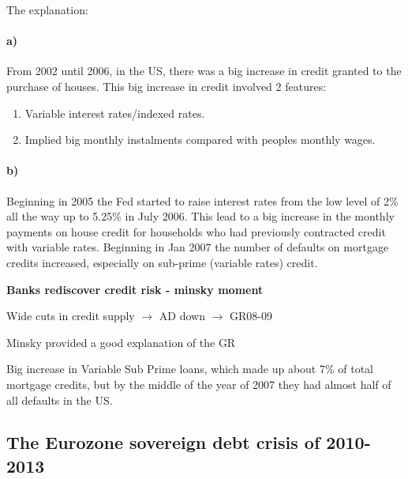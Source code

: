 \documentclass{report}
\begin{document}
The explanation:

\paragraph{a)} From 2002 until 2006, in the US, there was a big increase in credit granted to the purchase of houses. This big increase in credit involved 2 features:
\begin{enumerate}
    \item Variable interest rates/indexed rates. 
    \item Implied big monthly instalments compared with peoples monthly wages. 
\end{enumerate}
\paragraph{b)} Beginning in 2005 the Fed started to raise interest rates from the low level of 2\% all the way up to 5.25\% in July 2006. This lead to a big increase in the monthly payments on house credit for households who had previously contracted credit with variable rates. Beginning in Jan 2007 the number of defaults on mortgage credits increased, especially on sub-prime (variable rates) credit. 

\textbf{Banks rediscover credit risk - minsky moment}

Wide cuts in credit supply $\rightarrow$ AD down $\rightarrow$ GR08-09

Minsky provided a good explanation of the GR

Big increase in Variable Sub Prime loans, which made up about 7\% of total mortgage credits, but by the middle of the year of 2007 they had almost half of all defaults in the US. 


\subsection{The Eurozone sovereign debt crisis of 2010-2013}
\end{document}
